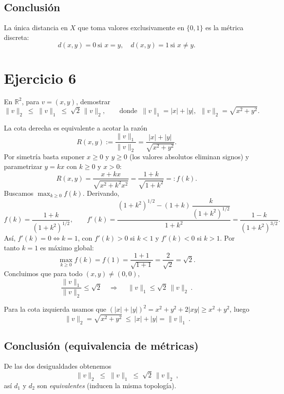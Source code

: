 \documentclass[12pt]{article}
\begin{document}
\subsection*{Conclusión}
La única distancia en $X$ que toma valores exclusivamente en $\{0,1\}$ es la métrica discreta:
\[
\boxed{\ d(x,y)=0 \ \text{si } x=y,\quad d(x,y)=1 \ \text{si } x\neq y.\ }
\]

\section*{Ejercicio 6}
En $\mathbb{R}^2$, para $v=(x,y)$, demostrar
\[
\|v\|_2 \;\le\; \|v\|_1 \;\le\; \sqrt{2}\,\|v\|_2,
\qquad
\text{donde }\ \|v\|_1=|x|+|y|,\ \ \|v\|_2=\sqrt{x^2+y^2}.
\]

La cota derecha es equivalente a acotar la raz\'on
\[
R(x,y):=\frac{\|v\|_1}{\|v\|_2}=\frac{|x|+|y|}{\sqrt{x^2+y^2}}.
\]
Por simetr\'ia basta suponer $x\ge 0$ y $y\ge 0$ (los valores absolutos eliminan signos) y parametrizar $y=kx$ con $k\ge 0$ y $x>0$:
\[
R(x,y)=\frac{x+kx}{\sqrt{x^2+k^2x^2}}
=\frac{1+k}{\sqrt{1+k^2}}=:f(k).
\]
Buscamos $\max_{k\ge 0} f(k)$. Derivando,
\[
f(k)=\frac{1+k}{(1+k^2)^{1/2}},\qquad
f'(k)=\frac{(1+k^2)^{1/2}-(1+k)\,\dfrac{k}{(1+k^2)^{1/2}}}{1+k^2}
=\frac{1-k}{(1+k^2)^{3/2}}.
\]
Así, $f'(k)=0 \iff k=1$, con $f'(k)>0$ si $k<1$ y $f'(k)<0$ si $k>1$. Por tanto $k=1$ es m\'aximo global:
\[
\max_{k\ge 0} f(k) = f(1)=\frac{1+1}{\sqrt{1+1}}=\frac{2}{\sqrt{2}}=\sqrt{2}.
\]
Concluimos que para todo $(x,y)\ne(0,0)$,
\[
\frac{\|v\|_1}{\|v\|_2}\le \sqrt{2}
\quad\Longrightarrow\quad
\boxed{\ \|v\|_1 \le \sqrt{2}\,\|v\|_2\ }.
\]

Para la cota izquierda usamos que $(|x|+|y|)^2=x^2+y^2+2|xy|\ge x^2+y^2$, luego
\[
\boxed{\ \|v\|_2=\sqrt{x^2+y^2}\ \le\ |x|+|y|=\|v\|_1\ }.
\]

\subsection*{Conclusi\'on (equivalencia de m\'etricas)}
De las dos desigualdades obtenemos
\[
\boxed{\ \|v\|_2 \;\le\; \|v\|_1 \;\le\; \sqrt{2}\,\|v\|_2\ },
\]
así $d_1$ y $d_2$ son \emph{equivalentes} (inducen la misma topología).
\end{document}
